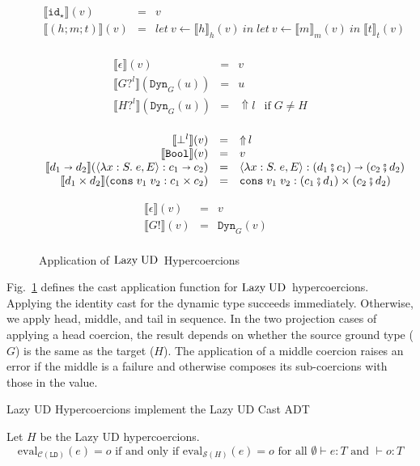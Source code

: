 \documentclass[runningheads]{llncs}
\newcommand{\sidecond}[1]{\text{if}\;#1}
\newcommand{\figequalto}[3]{#1 & = & #2 & #3 \\}
\newcommand{\LUD}{\ensuremath{\text{Lazy\;UD}}}
\newcommand{\CMachine}[1]{\ensuremath{\mathcal{C}(#1)}}
\newcommand{\LDMachine}{\CMachine{\BLD}}
\newcommand{\SMachine}[1]{\ensuremath{\mathcal{S}(#1)}}
\newcommand{\error}[1]{\ensuremath{\mathop{\Uparrow}#1}}
\newcommand{\Tdyn}[0]{\ensuremath{\star}}
\newcommand{\Pbool}[0]{\ensuremath{\mathtt{Bool}}}
\newcommand{\Pfunc}[2]{\ensuremath{#1 \shortrightarrow #2}}
\newcommand{\Pprod}[2]{\ensuremath{#1 \times #2}}
\newcommand{\elam}[3]{\lambda#1:#2.\;#3}
\newcommand{\econs}[2]{\mathtt{cons} \; #1 \; #2}
\newcommand{\ecast}[2]{\ensuremath{#1 : #2}}
\newcommand{\vdyn}[2]{\mathtt{Dyn}_{#1}(#2)}
\newcommand{\vfunc}[4]{\langle\elam{#1}{#2}{#3},#4\rangle}
\newcommand{\vcons}[2]{\econs{#1}{#2}}
\newcommand{\BLD}[0]{\ensuremath{\mathtt{LD}}}
\newcommand{\cnfid}[1]{\ensuremath{\mathtt{id}_{#1}}}
\newcommand{\hcci}[0]{\cnfid{\Tdyn}}
\newcommand{\hccc}[3]{\ensuremath{(#1;#2;#3)}}
\newcommand{\hche}[0]{\ensuremath{\epsilon}}
\newcommand{\hchp}[2]{\ensuremath{#1?^{#2}}}
\newcommand{\hcmbool}[0]{\Pbool}
\newcommand{\hcmfunc}[2]{\Pfunc{#1}{#2}}
\newcommand{\hcmprod}[2]{\Pprod{#1}{#2}}
\newcommand{\hcmfail}[1]{\ensuremath{\bot^l}}
\newcommand{\hcte}[0]{\ensuremath{\epsilon}}
\newcommand{\hcti}[1]{\ensuremath{#1!}}
\newcommand{\mlet}[3]{\ensuremath{
\mathit{let}\ {#1\leftarrow#2}\ \mathit{in}\;#3}}
\newcommand{\denote}[1]{\ensuremath{\llbracket #1 \rrbracket}}
\newcommand{\compose}[2]{\ensuremath{#1 \fatsemi #2}}
\newcommand{\expressiontyping}[3]{\ensuremath{#1 \vdash #2 : #3}}
\newcommand{\valuetyping}[2]{\ensuremath{\vdash #1 : #2}}
\newcommand{\withmachineevalto}[3]{\ensuremath{\mathrm{eval}_{#1}(#2)=#3}}
\newcommand{\machineequiv}[2]{
	\ensuremath{
		\withmachineevalto{#1}{e}{o}	
		\text{ if and only if }
		\withmachineevalto{#2}{e}{o}
		\text{ for all }
		\expressiontyping{\emptyset}{e}{T}
		\text{ and }
		\valuetyping{o}{T}
	}}
\begin{document}
\begin{figure}[tp]
	\fbox{$\denote{c}_c(v)=r$}
	\[
	\begin{array}{rclr}
	\figequalto{\denote{\hcci}(v)}{v}{}
	\figequalto{\denote{\hccc{h}{m}{t}}(v)}{
	    \mlet{v}{\denote{h}_h(v)}{
	    \mlet{v}{\denote{m}_m(v)}{
	    \denote{t}_t(v)}}
	}{}
	\end{array}
	\]
	
	\fbox{$\denote{h}_h(v)=r$}
	\[
	\begin{array}{rclr}
	\figequalto{\denote{\hche}(v)}{v}{}
	\figequalto{\denote{\hchp{G}{l}}(\vdyn{G}{u})}{u}{}
	\figequalto{\denote{\hchp{H}{l}}(\vdyn{G}{u})}{\error{l}}{
		\sidecond{G \neq H}
	}
	\end{array}
	\]
	
	\fbox{$\denote{m}_m(v)=r$}
	\[
	\begin{array}{rclr}
	\figequalto{\denote{\hcmfail{l}}(v)}{\error{l}}{}
	\figequalto{\denote{\hcmbool}(v)}{v}{}
	\figequalto{\denote{\hcmfunc{d_1}{d_2}}(\ecast{\vfunc{x}{S}{e}{E}}{\Pfunc{c_1}{c_2}})}{
		\ecast{\vfunc{x}{S}{e}{E}}{\Pfunc{(\compose{d_1}{c_1})}{(\compose{c_2}{d_2})}}
	}{}
	\figequalto{\denote{\hcmprod{d_1}{d_2}}(\ecast{\vcons{v_1}{v_2}}{\Pprod{c_1}{c_2}})}{
		\ecast{\vcons{v_1}{v_2}}{\Pprod{(\compose{c_1}{d_1})}{(\compose{c_2}{d_2})}}
	}{}
	\end{array}
	\]
	
	\fbox{$\denote{t}_t(v)=r$}
	\[
	\begin{array}{rclr}
	\figequalto{\denote{\hcte}(v)}{v}{}
	\figequalto{\denote{\hcti{G}}(v)}{\vdyn{G}{v}}{}
	\end{array}
	\]
	\caption{Application of \LUD\ Hypercoercions}
	\label{fig:LazyUD-Hypercoercions-application}
\end{figure}

Fig.~\ref{fig:LazyUD-Hypercoercions-application} defines the cast application 
function for \LUD\ hypercoercions.
Applying the identity cast for the dynamic type succeeds immediately. 
Otherwise, we apply head, middle, and tail in sequence. 
%
In the two projection cases of applying a head coercion, the result
depends on whether the source ground type ($G$) is the same as the
target ($H$).
%
The application of a middle coercion raises an error if the middle is
a failure and otherwise composes its sub-coercions with those in the
value.

\begin{proposition} Lazy UD Hypercoercions implement the Lazy UD Cast ADT
\end{proposition}
\begin{theorem} Let $H$ be the Lazy UD 
	hypercoercions.
	\[\machineequiv{\LDMachine}{\SMachine{H}}\]
\end{theorem}
\end{document}
